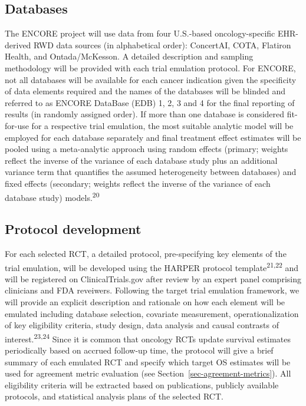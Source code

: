 \documentclass[
  letterpaper,
  DIV=11,
  numbers=noendperiod]{scrartcl}
\begin{document}
\subsection{Databases}\label{databases}

The ENCORE project will use data from four U.S.-based oncology-specific
EHR-derived RWD data sources (in alphabetical order): ConcertAI, COTA,
Flatiron Health, and Ontada/McKesson. A detailed description and
sampling methodology will be provided with each trial emulation
protocol. For ENCORE, not all databases will be available for each
cancer indication given the specificity of data elements required and
the names of the databases will be blinded and referred to as ENCORE
DataBase (EDB) 1, 2, 3 and 4 for the final reporting of results (in
randomly assigned order). If more than one database is considered
fit-for-use for a respective trial emulation, the most suitable analytic
model will be employed for each database separately and final treatment
effect estimates will be pooled using a meta-analytic approach using
random effects (primary; weights reflect the inverse of the variance of
each database study plus an additional variance term that quantifies the
assumed heterogeneity between databases) and fixed effects (secondary;
weights reflect the inverse of the variance of each database study)
models.\textsuperscript{20}

\subsection{Protocol development}\label{protocol-development}

For each selected RCT, a detailed protocol, pre-specifying key elements
of the trial emulation, will be developed using the HARPER protocol
template\textsuperscript{21,22} and will be registered on
ClinicalTrials.gov after review by an expert panel comprising clinicians
and FDA reveiwers. Following the target trial emulation framework, we
will provide an explicit description and rationale on how each element
will be emulated including database selection, covariate measurement,
operationalization of key eligibility criteria, study design, data
analysis and causal contrasts of interest.\textsuperscript{23,24} Since
it is common that oncology RCTs update survival estimates periodically
based on accrued follow-up time, the protocol will give a brief summary
of each emulated RCT and specify which target OS estimates will be used
for agreement metric evaluation (see
Section~\ref{sec-agreement-metrics}). All eligibility criteria will be
extracted based on publications, publicly available protocols, and
statistical analysis plans of the selected RCT.
\end{document}
